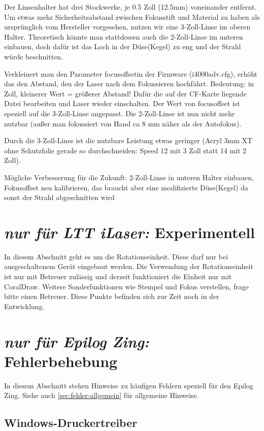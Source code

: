 \documentclass{\basedir/fablab-document}
\newcommand{\nurZing}{\emph{nur für Epilog Zing:} }
\newcommand{\nurLTT}{\emph{nur für LTT iLaser:} }
\renewcommand{\todo}[1]{\textbf{\color{red}{TODO: #1}}}
\begin{document}
	Der Linsenhalter hat drei \glqq Stockwerke\grqq, je 0.5 Zoll (12.5mm) voneinander entfernt. Um etwas mehr Sicherheitsabstand zwischen Fokusstift und Material zu haben als ursprünglich vom Hersteller vorgesehen, nutzen wir eine 3-Zoll-Linse im oberen Halter. Theoretisch könnte man stattdessen auch die 2-Zoll-Linse im unteren einbauen, doch dafür ist das Loch in der \glqq Düse\grqq (Kegel) zu eng und der Strahl würde beschnitten.
	
	Verkleinert man den Parameter \glqq focusoffset\grqq in der Firmware (i4000adv.cfg), erhöht das den Abstand, den der Laser nach dem Fokussieren hochfährt. Bedeutung: in Zoll, kleinerer Wert = größerer Abstand! Dafür die auf der CF-Karte liegende Datei bearbeiten und Laser wieder einschalten. Der Wert von focusoffset ist speziell auf die 3-Zoll-Linse angepasst. Die 2-Zoll-Linse ist nun nicht mehr nutzbar (außer man fokussiert von Hand ca 8 mm näher als der Autofokus).
	
	Durch die 3-Zoll-Linse ist die nutzbare Leistung etwas geringer (Acryl 3mm XT ohne Schutzfolie gerade so durchschneiden: Speed 12 mit 3 Zoll statt 14 mit 2 Zoll).
	
	Mögliche Verbesserung für die Zukunft: 2-Zoll-Linse in unteren Halter einbauen, Fokusoffset neu kalibrieren, das braucht aber eine modifizierte \glqq Düse\grqq (Kegel) da sonst der Strahl abgeschnitten wird
	

	
	\section{\nurLTT Experimentell}
	In diesem Abschnitt geht es um die Rotationseinheit. Diese darf nur bei ausgeschaltenem Gerät eingebaut werden. Die Verwendung der Rotationseinheit ist nur mit Betreuer zulässig und derzeit funktioniert die Einheit nur mit CoralDraw.
	Weitere Sonderfunktionen wie Stempel und Fokus verstellen, frage bitte einen Betreuer. Diese Punkte befinden sich zur Zeit noch in der Entwicklung. 
	\todo{}
	
	\section{\nurZing Fehlerbehebung}
	In diesem Abschnitt stehen Hinweise zu häufigen Fehlern speziell für den Epilog Zing. Siehe auch \cref{sec:fehler-allgemein} für allgemeine Hinweise.
	
	\subsection{Windows-Druckertreiber}	
\end{document}
